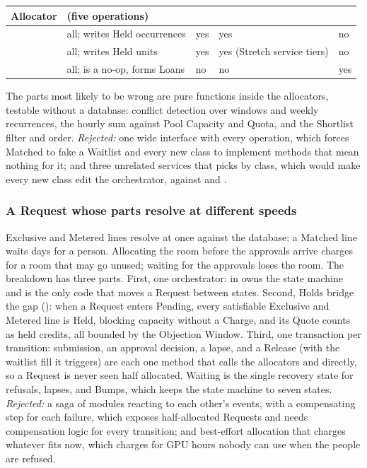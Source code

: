 {\small\renewcommand{\arraystretch}{1.05}
\begin{tabularx}{\textwidth}{@{}L{3.1cm}L{4.4cm}YYY@{}}
\toprule
\textbf{Allocator} & \textbf{ (five operations)} & \textbf{} & \textbf{} & \textbf{} \\
\midrule
{} & all;  writes Held occurrences & yes & yes & no \\
 & all;  writes Held units & yes & yes (Stretch service tiers) & no \\
 & all;  is a no-op,  forms Loans & no & no & yes \\
\bottomrule
\end{tabularx}
}

The parts most likely to be wrong are pure functions inside the allocators, testable without a database: conflict detection over windows and weekly recurrences, the hourly sum against Pool Capacity and Quota, and the Shortlist filter and order. \emph{Rejected:} one wide interface with every operation, which forces Matched to fake a Waitlist and every new class to implement methods that mean nothing for it; and three unrelated services that  picks by class, which would make every new class edit the orchestrator, against  and .

\subsubsection{A Request whose parts resolve at different speeds}

Exclusive and Metered lines resolve at once against the database; a Matched line waits days for a person. Allocating the room before the approvals arrive charges for a room that may go unused; waiting for the approvals loses the room. The breakdown has three parts. First, one orchestrator:  in  owns the state machine and is the only code that moves a Request between states. Second, Holds bridge the gap (): when a Request enters Pending, every satisfiable Exclusive and Metered line is Held, blocking capacity without a Charge, and its Quote counts as held credits, all bounded by the Objection Window. Third, one transaction per transition: submission, an approval decision, a lapse, and a Release (with the waitlist fill it triggers) are each one  method that calls the allocators and  directly, so a Request is never seen half allocated. Waiting is the single recovery state for refusals, lapses, and Bumps, which keeps the state machine to seven states. \emph{Rejected:} a saga of modules reacting to each other's events, with a compensating step for each failure, which exposes half-allocated Requests and needs compensation logic for every transition; and best-effort allocation that charges whatever fits now, which charges for GPU hours nobody can use when the people are refused.

